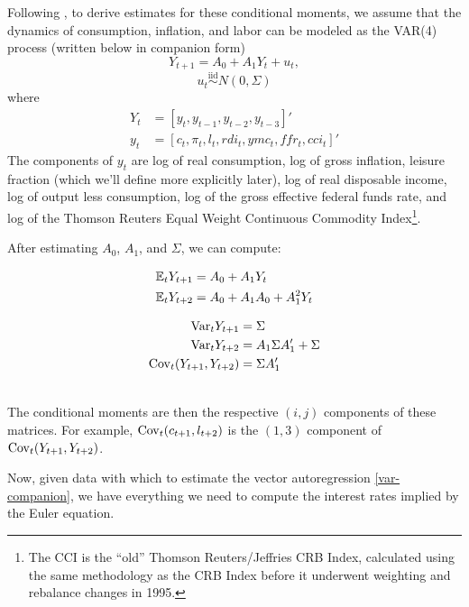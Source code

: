 Following \cite{canzoneri07}, to derive estimates for these conditional moments, we assume that the dynamics of consumption, inflation, and labor can be modeled as the VAR(4) process (written below in companion form)
\begin{equation}
\label{var-companion}
Y_{t+1} = A_0 + A_1 Y_t + u_t,
\end{equation}
$$u_t \overset{\text{iid}}{\sim} N(0, \Sigma)$$
where
\begin{align*}
Y_t &= [y_t, y_{t-1}, y_{t-2}, y_{t-3}]' \\
y_t &= [c_t, \pi_t, l_t, rdi_t, ymc_t, ffr_t, cci_t]'
\end{align*}
The components of $y_t$ are log of real consumption, log of gross inflation, leisure fraction (which we'll define more explicitly later), log of real disposable income, log of output less consumption, log of the gross effective federal funds rate, and log of the Thomson Reuters Equal Weight Continuous Commodity Index\footnote{The CCI is the ``old'' Thomson Reuters/Jeffries CRB Index, calculated using the same methodology as the CRB Index before it underwent weighting and rebalance changes in 1995.}.

After estimating $A_0$, $A_1$, and $\Sigma$, we can compute:

\begin{minipage}[c]{0.5\textwidth}
\begin{align*}
\mathbb{E}_t Y_{t+1} &= A_0 + A_1 Y_t \\
\mathbb{E}_t Y_{t+2} &= A_0 + A_1 A_0 + A_1^2 Y_t
\end{align*}
\end{minipage}
\begin{minipage}[c]{0.5\textwidth}
\begin{align*}
\mathrm{Var}_t Y_{t+1} &= \Sigma \\
\mathrm{Var}_t Y_{t+2} &= A_1 \Sigma A_1' + \Sigma \\
\mathrm{Cov}_t(Y_{t+1}, Y_{t+2}) &= \Sigma A_1'
\end{align*}
\end{minipage} \\

The conditional moments are then the respective $(i, j)$ components of these matrices. For example, $\mathrm{Cov}_t(c_{t+1}, l_{t+2})$ is the $(1, 3)$ component of $\mathrm{Cov}_t(Y_{t+1}, Y_{t+2})$.

Now, given data with which to estimate the vector autoregression \eqref{var-companion}, we have everything we need to compute the interest rates implied by the Euler equation.
